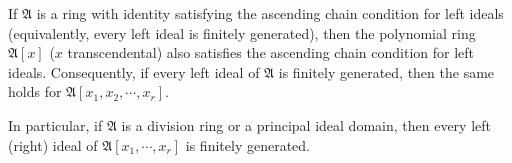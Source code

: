 If $\mathfrak{A}$ is a ring with identity satisfying the ascending chain condition for left ideals (equivalently, every left ideal is finitely generated), then the polynomial ring $\mathfrak{A}[x]$ ($x$ transcendental) also satisfies the ascending chain condition for left ideals. Consequently, if every left ideal of $\mathfrak{A}$ is finitely generated, then the same holds for $\mathfrak{A}[x_1, x_2, \cdots, x_r]$.

In particular, if $\mathfrak{A}$ is a division ring or a principal ideal domain, then every left (right) ideal of $\mathfrak{A}[x_1, \cdots, x_r]$ is finitely generated.
